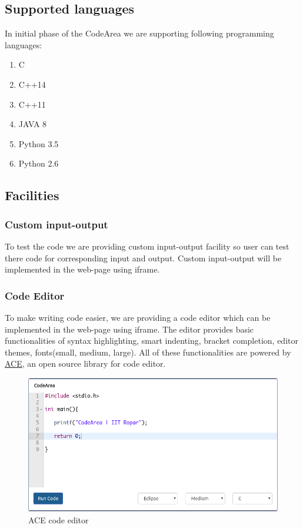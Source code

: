 \documentclass{article}
\begin{document}
\subsection{Supported languages}
In initial phase of the CodeArea we are supporting following programming languages:
\begin{enumerate}
    \item C
    \item C++14
    \item C++11
    \item JAVA 8
    \item Python 3.5
    \item Python 2.6
\end{enumerate}

\vspace{1cm}

\subsection{Facilities}
\vspace{0.3cm}
\subsubsection{Custom input-output}
To test the code we are providing custom input-output facility so user can test there code for corresponding input and output. Custom input-output will be implemented in the web-page using iframe.
\newpage
\subsubsection{Code Editor}
To make writing code easier, we are providing a code editor which can be implemented in the web-page using iframe. The editor provides basic functionalities of syntax highlighting, smart indenting, bracket completion, editor themes, fonts(small, medium, large).
All of these functionalities are powered by \href{https://ace.c9.io/}{ACE}, an open source library for code editor.
\begin{figure}[h!]
    \centering
    \includegraphics[width=0.8\linewidth]{sample_code_editor.png}
    \caption{ACE code editor}
    \label{fig:code_editor}
\end{figure}
\end{document}
